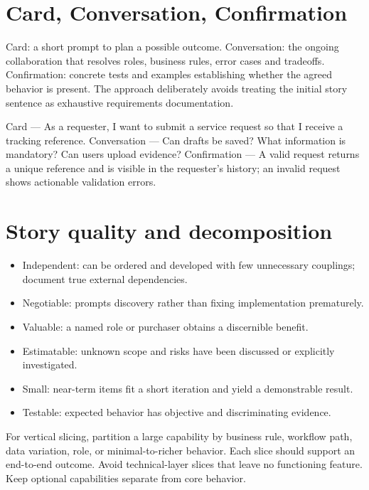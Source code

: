 \documentclass[11pt,letterpaper]{article}
\begin{document}
\section{Card, Conversation, Confirmation}
Card: a short prompt to plan a possible outcome. Conversation: the ongoing collaboration that resolves roles, business rules, error cases and tradeoffs. Confirmation: concrete tests and examples establishing whether the agreed behavior is present. The approach deliberately avoids treating the initial story sentence as exhaustive requirements documentation.

\begin{tcolorbox}[colback=tealback,colframe=navy,title={Original example: service request},breakable]
Card — As a requester, I want to submit a service request so that I receive a tracking reference. Conversation — Can drafts be saved? What information is mandatory? Can users upload evidence? Confirmation — A valid request returns a unique reference and is visible in the requester’s history; an invalid request shows actionable validation errors.

\end{tcolorbox}
\section{Story quality and decomposition}
\begin{itemize}[leftmargin=*,itemsep=2pt]
\item Independent: can be ordered and developed with few unnecessary couplings; document true external dependencies.
\item Negotiable: prompts discovery rather than fixing implementation prematurely.
\item Valuable: a named role or purchaser obtains a discernible benefit.
\item Estimatable: unknown scope and risks have been discussed or explicitly investigated.
\item Small: near-term items fit a short iteration and yield a demonstrable result.
\item Testable: expected behavior has objective and discriminating evidence.
\end{itemize}
For vertical slicing, partition a large capability by business rule, workflow path, data variation, role, or minimal-to-richer behavior. Each slice should support an end-to-end outcome. Avoid technical-layer slices that leave no functioning feature. Keep optional capabilities separate from core behavior.
\end{document}

